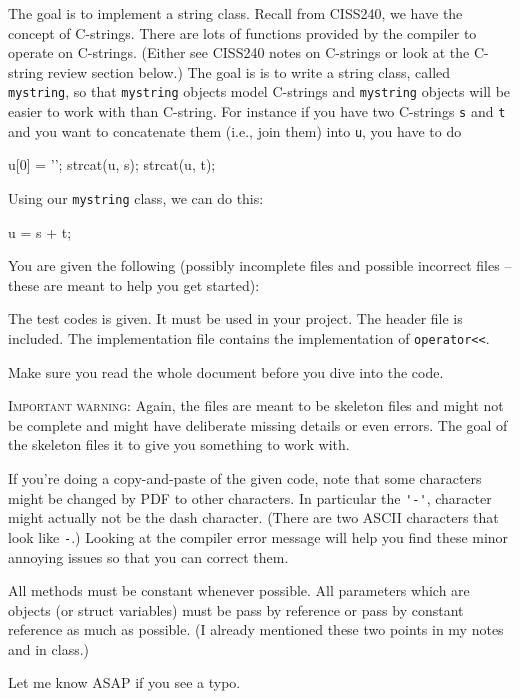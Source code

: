 The goal is to implement a string class.
Recall from CISS240, we have the concept of C-strings.
There are lots of functions provided by the compiler to operate on C-strings.
(Either see CISS240 notes on C-strings or look at the C-string review section below.)
The goal is is to write a string class, called \verb!mystring!, so that \verb!mystring! objects
model C-strings and \verb!mystring! objects will be easier to work with than C-string.
For instance if you have two C-strings \verb!s! and \verb!t! and you want to concatenate them (i.e., join them) into \verb!u!,
you have to do
\begin{console}
u[0] = '\0';
strcat(u, s);
strcat(u, t);
\end{console}
Using our \verb!mystring! class, we can do this:
\begin{console}
u = s + t;
\end{console}

You are given the following (possibly incomplete files and possible incorrect files -- these are meant to help you get started):
\begin{tightlist}
    \li    The test codes is given. It must be used in your project.
    \li    The header file is included.
    \li    The implementation file contains the implementation of \verb!operator<<!.
\end{tightlist}

Make sure you read the whole document before you dive into the code.

\textsc{Important warning}: Again, the files are meant to be skeleton files and might not be complete and
might have deliberate missing details or even errors.
The goal of the skeleton files it to give you something to work with.

If you're doing a copy-and-paste of the given code,
note that some characters might be changed by
PDF to other characters. In particular the \verb!'-'!,
character might actually not be the dash character.
(There are two ASCII characters that look like \verb!-!.)
Looking
at the compiler error message will help you find these minor annoying issues so that you can correct
them.

All methods must be constant whenever possible.
All parameters which are objects (or struct
variables) must be pass by reference or pass by constant reference
as much as possible.
(I already mentioned these two points in my notes and in class.)

Let me know ASAP if you see a typo.

